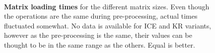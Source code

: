 \begin{figure}[t]
    \begin{centering}
         \\
        \caption[Matrix loading times]
        {\textbf{Matrix loading times} for the different matrix sizes. Even though
        the operations are the same during pre-processing, actual times fluctuated
        somewhat. No data is available for ICE and KR variants, however as the
        pre-processing is the same, their values can be thought to be in the same
        range as the others.
        Equal is better.}
    \label{fig:loadtimes}
\end{centering}
\end{figure}



